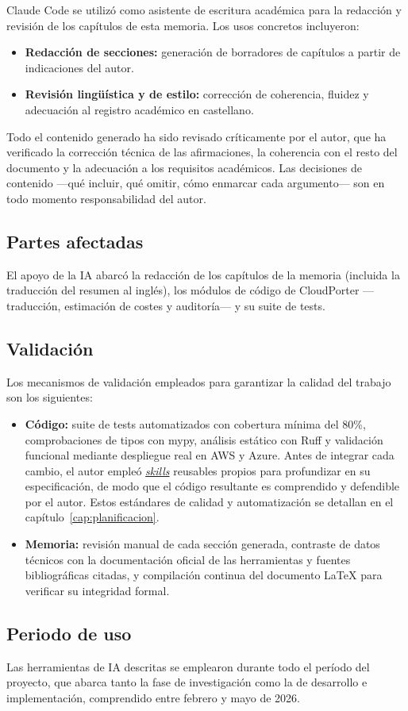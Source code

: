 Claude Code se utilizó como asistente de escritura académica para la redacción y revisión
de los capítulos de esta memoria. Los usos concretos incluyeron:

\begin{itemize}
    \item \textbf{Redacción de secciones:} generación de borradores de capítulos a partir
    de indicaciones del autor.
    \item \textbf{Revisión lingüística y de estilo:} corrección de coherencia, fluidez y
    adecuación al registro académico en castellano.
\end{itemize}

Todo el contenido generado ha sido revisado críticamente por el autor, que ha verificado
la corrección técnica de las afirmaciones, la coherencia con el resto del documento y
la adecuación a los requisitos académicos. Las decisiones de contenido —qué incluir,
qué omitir, cómo enmarcar cada argumento— son en todo momento responsabilidad del autor.

\subsection{Partes afectadas}

El apoyo de la IA abarcó la redacción de los capítulos de la memoria (incluida la traducción
del resumen al inglés), los módulos de código de CloudPorter —traducción, estimación de costes
y auditoría— y su suite de tests.

\subsection{Validación}

Los mecanismos de validación empleados para garantizar la calidad del trabajo son los
siguientes:

\begin{itemize}
    \item \textbf{Código:} suite de tests automatizados con cobertura mínima del 80\%,
    comprobaciones de tipos con mypy, análisis estático con Ruff y validación funcional
    mediante despliegue real en AWS y Azure. Antes de integrar cada cambio, el autor empleó
    \hyperlink{skill}{\textit{skills}} reusables propios para profundizar en su especificación, de modo que el
    código resultante es comprendido y defendible por el autor. Estos estándares de calidad y
    automatización se detallan en el capítulo~\ref{cap:planificacion}.
    \item \textbf{Memoria:} revisión manual de cada sección generada, contraste de datos
    técnicos con la documentación oficial de las herramientas y fuentes bibliográficas
    citadas, y compilación continua del documento LaTeX para verificar su integridad formal.
\end{itemize}

\subsection{Periodo de uso}

Las herramientas de IA descritas se emplearon durante todo el período del proyecto, que abarca
tanto la fase de investigación como la de desarrollo e implementación, comprendido entre febrero
y mayo de 2026.

